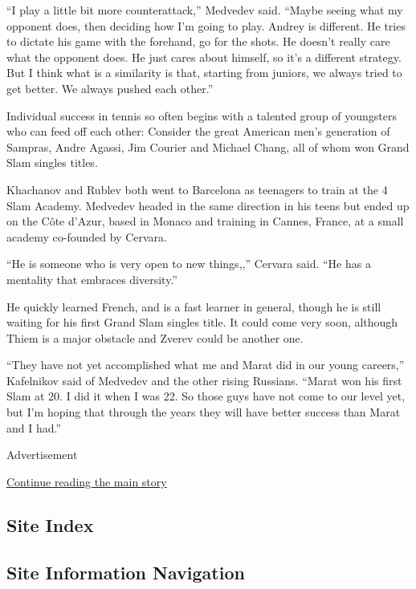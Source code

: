 ``I play a little bit more counterattack,'' Medvedev said. ``Maybe
seeing what my opponent does, then deciding how I'm going to play.
Andrey is different. He tries to dictate his game with the forehand, go
for the shots. He doesn't really care what the opponent does. He just
cares about himself, so it's a different strategy. But I think what is a
similarity is that, starting from juniors, we always tried to get
better. We always pushed each other.''

Individual success in tennis so often begins with a talented group of
youngsters who can feed off each other: Consider the great American
men's generation of Sampras, Andre Agassi, Jim Courier and Michael
Chang, all of whom won Grand Slam singles titles.

Khachanov and Rublev both went to Barcelona as teenagers to train at the
4 Slam Academy. Medvedev headed in the same direction in his teens but
ended up on the Côte d'Azur, based in Monaco and training in Cannes,
France, at a small academy co-founded by Cervara.

``He is someone who is very open to new things,,'' Cervara said. ``He
has a mentality that embraces diversity.''

He quickly learned French, and is a fast learner in general, though he
is still waiting for his first Grand Slam singles title. It could come
very soon, although Thiem is a major obstacle and Zverev could be
another one.

``They have not yet accomplished what me and Marat did in our young
careers,'' Kafelnikov said of Medvedev and the other rising Russians.
``Marat won his first Slam at 20. I did it when I was 22. So those guys
have not come to our level yet, but I'm hoping that through the years
they will have better success than Marat and I had.''

Advertisement

\protect\hyperlink{after-bottom}{Continue reading the main story}

\hypertarget{site-index}{%
\subsection{Site Index}\label{site-index}}

\hypertarget{site-information-navigation}{%
\subsection{Site Information
Navigation}\label{site-information-navigation}}


